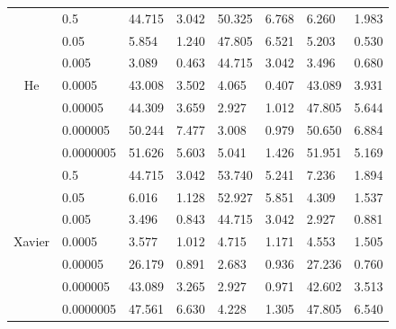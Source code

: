 \begin{table}[H]
\begin{tabular}{cl|lrlllr|}
\multicolumn{1}{|c|}{\multirow{7}{*}{He}}     & 0.5       & 44.715 & \multicolumn{1}{l|}{3.042} & 50.325 & \multicolumn{1}{l|}{6.768} & 6.260          & 1.983        \\
\multicolumn{1}{|c|}{}                        & 0.05      & 5.854  & \multicolumn{1}{l|}{1.240} & 47.805 & \multicolumn{1}{l|}{6.521} & 5.203          & 0.530        \\
\multicolumn{1}{|c|}{}                        & 0.005     & 3.089  & \multicolumn{1}{r|}{0.463} & 44.715 & \multicolumn{1}{l|}{3.042} & 3.496          & 0.680        \\
\multicolumn{1}{|c|}{}                        & 0.0005    & 43.008 & \multicolumn{1}{l|}{3.502} & 4.065  & \multicolumn{1}{r|}{0.407} & 43.089         & 3.931        \\
\multicolumn{1}{|c|}{}                        & 0.00005   & 44.309 & \multicolumn{1}{l|}{3.659} & 2.927  & \multicolumn{1}{r|}{1.012} & 47.805         & 5.644        \\
\multicolumn{1}{|c|}{}                        & 0.000005  & 50.244 & \multicolumn{1}{l|}{7.477} & 3.008  & \multicolumn{1}{r|}{0.979} & 50.650         & 6.884        \\
\multicolumn{1}{|c|}{}                        & 0.0000005 & 51.626 & \multicolumn{1}{l|}{5.603} & 5.041  & \multicolumn{1}{r|}{1.426} & 51.951         & 5.169        \\ \hline
\multicolumn{1}{|c|}{\multirow{7}{*}{Xavier}} & 0.5       & 44.715 & \multicolumn{1}{r|}{3.042} & 53.740 & \multicolumn{1}{l|}{5.241} & 7.236          & 1.894        \\
\multicolumn{1}{|c|}{}                        & 0.05      & 6.016  & \multicolumn{1}{r|}{1.128} & 52.927 & \multicolumn{1}{l|}{5.851} & 4.309          & 1.537        \\
\multicolumn{1}{|c|}{}                        & 0.005     & 3.496  & \multicolumn{1}{r|}{0.843} & 44.715 & \multicolumn{1}{l|}{3.042} & 2.927          & 0.881        \\
\multicolumn{1}{|c|}{}                        & 0.0005    & 3.577  & \multicolumn{1}{r|}{1.012} & 4.715  & \multicolumn{1}{r|}{1.171} & 4.553          & 1.505        \\
\multicolumn{1}{|c|}{}                        & 0.00005   & 26.179 & \multicolumn{1}{r|}{0.891} & 2.683  & \multicolumn{1}{r|}{0.936} & 27.236         & 0.760        \\
\multicolumn{1}{|c|}{}                        & 0.000005  & 43.089 & \multicolumn{1}{r|}{3.265} & 2.927  & \multicolumn{1}{r|}{0.971} & 42.602         & 3.513        \\
\multicolumn{1}{|c|}{}                        & 0.0000005 & 47.561 & \multicolumn{1}{r|}{6.630} & 4.228  & \multicolumn{1}{l|}{1.305} & 47.805         & 6.540        \\ \hline
\end{tabular}
\label{table:alexnetconhard}
\end{table}


